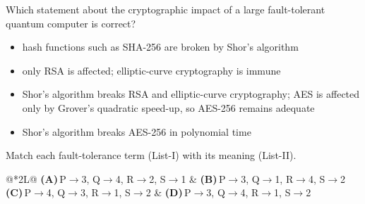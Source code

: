 \documentclass[11pt,a4paper]{article}
\newcommand{\optlabel}[1]{\textbf{(#1)}}
\newenvironment{qitem}[1]{\begin{list}{}{\setlength{\leftmargin}{3.3em}\setlength{\labelwidth}{3.1em}%
  \setlength{\labelsep}{0.2em}\setlength{\topsep}{3pt}\setlength{\parsep}{3pt}}\item[\textbf{Q.#1}\hfill]}{\end{list}}
\newcommand{\qsep}{\par\vspace{2pt}{\color{black!15}\hrule}\vspace{4pt}}
\begin{document}
\begin{qitem}{74}
Which statement about the cryptographic impact of a large fault-tolerant quantum computer is correct?
\begin{itemize}[leftmargin=2.6em, labelsep=0.4em, itemsep=2pt, topsep=3pt]
\item[\optlabel{A}] hash functions such as SHA-256 are broken by Shor's algorithm
\item[\optlabel{B}] only RSA is affected; elliptic-curve cryptography is immune
\item[\optlabel{C}] Shor's algorithm breaks RSA and elliptic-curve cryptography; AES is affected only by Grover's quadratic speed-up, so AES-256 remains adequate
\item[\optlabel{D}] Shor's algorithm breaks AES-256 in polynomial time
\end{itemize}
\end{qitem}
\qsep

\begin{qitem}{75}
Match each fault-tolerance term (List-I) with its meaning (List-II).
\par\smallskip{}
\par\smallskip\noindent\begin{tabularx}{\linewidth}{@{}*{2}{L}@{}}
\optlabel{A}\,P$\to$3, Q$\to$4, R$\to$2, S$\to$1 & \optlabel{B}\,P$\to$3, Q$\to$1, R$\to$4, S$\to$2 \\[3pt]
\optlabel{C}\,P$\to$4, Q$\to$3, R$\to$1, S$\to$2 & \optlabel{D}\,P$\to$3, Q$\to$4, R$\to$1, S$\to$2
\end{tabularx}
\end{qitem}
\qsep
\end{document}
